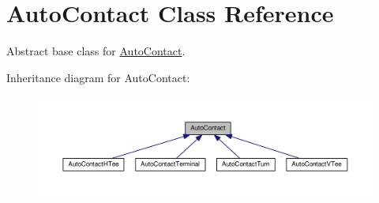 \hypertarget{classKatabatic_1_1AutoContact}{}\section{Auto\+Contact Class Reference}
\label{classKatabatic_1_1AutoContact}


Abstract base class for \hyperlink{classKatabatic_1_1AutoContact}{Auto\+Contact}.  




Inheritance diagram for Auto\+Contact\+:\nopagebreak
\begin{figure}[H]
\begin{center}
\leavevmode
\includegraphics[width=350pt]{classKatabatic_1_1AutoContact__inherit__graph}
\end{center}
\end{figure}
